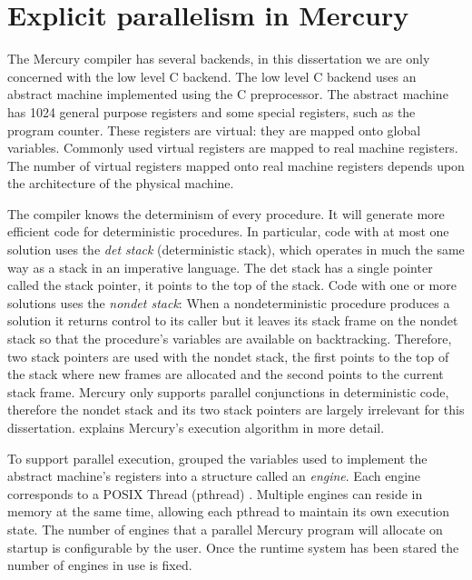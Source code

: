 \section{Explicit parallelism in Mercury}
\label{sec:backgnd_merpar}

The Mercury compiler has several backends,
in this dissertation we are only concerned with the low level C backend.
The low level C backend uses an abstract machine implemented using the C
preprocessor.
The abstract machine has 1024 general purpose registers and some
special registers, such as the program counter.
These registers are virtual:
they are mapped onto global variables.
Commonly used virtual registers are mapped to real machine registers.
The number of virtual registers mapped onto real machine registers depends upon
the architecture of the physical machine.

The compiler knows the determinism of every procedure.
It will generate more efficient code for deterministic procedures.
In particular,
code with at most one solution uses the \emph{det stack} (deterministic
stack),
which operates in much the same way as a stack in an imperative
language.
The det stack has a single pointer called the stack pointer,
it points to the top of the stack.
Code with one or more solutions uses the \emph{nondet stack}:
When a nondeterministic procedure produces a solution it returns control to
its caller but
it leaves its stack frame on the nondet stack so that
the procedure's variables are available on backtracking.
Therefore,
two stack pointers are used with the nondet stack,
the first points to the top of the stack where new frames are allocated
and the second points to the current stack frame.
Mercury only supports parallel conjunctions in deterministic code,
therefore the nondet stack and its two stack pointers are largely irrelevant
for this dissertation.
\citet*{mercury_jlp} explains Mercury's execution algorithm in more detail.

\label{page:engine}
To support parallel execution,
\citet*{conway:2002:par} grouped the variables used to implement the abstract
machine's registers into a structure called an \emph{engine}.
Each engine corresponds to a POSIX Thread (pthread)
\citep{butenhof1997:pthreads}.
Multiple engines can reside in memory at the same time,
allowing each pthread to maintain its own execution state.
The number of engines that a parallel Mercury program will allocate on startup
is configurable by the user.
Once the runtime system has been stared the number of engines in use is
fixed.

